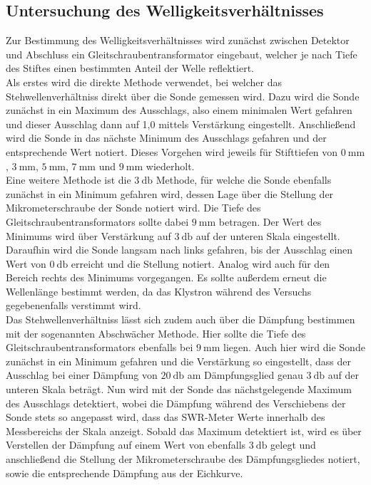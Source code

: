 \subsection{Untersuchung des Welligkeitsverhältnisses}
Zur Bestimmung des Welligkeitsverhältnisses wird zunächst zwischen Detektor und Abschluss ein
Gleitschraubentransformator eingebaut, welcher je nach Tiefe des Stiftes einen bestimmten
Anteil der Welle reflektiert. \\
Als erstes wird die direkte Methode verwendet, bei welcher das Stehwellenverhältniss direkt über die
Sonde gemessen wird. Dazu wird die Sonde zunächst in ein Maximum des Ausschlags, also einem minimalen
Wert gefahren und dieser Ausschlag dann auf 1,0 mittels Verstärkung eingestellt. Anschließend
wird die Sonde in das nächste Minimum des Ausschlags gefahren und der entsprechende Wert notiert.
Dieses Vorgehen wird jeweils für Stifttiefen von $\SI{0}{\milli\meter}$, $\SI{3}{\milli\meter}$,
$\SI{5}{\milli\meter}$, $\SI{7}{\milli\meter}$ und $\SI{9}{\milli\meter}$ wiederholt. \\
Eine weitere Methode ist die $\SI{3}{\decibel}$ Methode, für welche die Sonde ebenfalls zunächst in
ein Minimum gefahren wird, dessen Lage über die Stellung der Mikrometerschraube der Sonde notiert wird.
Die Tiefe des Gleitschraubentransformators sollte dabei $\SI{9}{\milli\meter}$ betragen.
Der Wert des Minimums wird über Verstärkung auf $\SI{3}{\decibel}$ auf der unteren
Skala eingestellt. Daraufhin wird die Sonde langsam nach links gefahren, bis der Ausschlag einen
Wert von $\SI{0}{\decibel}$ erreicht und die Stellung notiert. Analog wird auch für den Bereich rechts des Minimums
vorgegangen. Es sollte außerdem erneut die Wellenlänge bestimmt werden, da das Klystron während des
Versuchs gegebenenfalls verstimmt wird. \\
Das Stehwellenverhältniss lässt sich zudem auch über die Dämpfung bestimmen mit der sogenannten Abschwächer
Methode. Hier sollte die Tiefe des Gleitschraubentransformators ebenfalls bei $\SI{9}{\milli\meter}$ liegen.
Auch hier wird die Sonde zunächst in ein Minimum gefahren und die Verstärkung so eingestellt, dass der Ausschlag bei
einer Dämpfung von $\SI{20}{\decibel}$ am Dämpfungsglied genau $\SI{3}{\decibel}$ auf der unteren Skala
beträgt. Nun wird mit der Sonde das nächstgelegende Maximum des Ausschlags detektiert, wobei die
Dämpfung während des Verschiebens der Sonde stets so angepasst wird, dass das SWR-Meter Werte innerhalb des
Messbereichs der Skala anzeigt. Sobald das Maximum detektiert ist, wird es über Verstellen der Dämpfung
auf einem Wert von ebenfalls $\SI{3}{\decibel}$ gelegt und anschließend die Stellung der Mikrometerschraube
des Dämpfungsgliedes notiert, sowie die entsprechende Dämpfung aus der Eichkurve.
